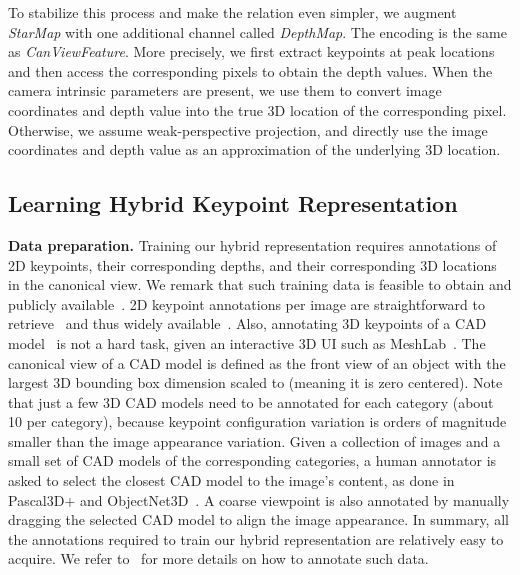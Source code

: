 \documentclass[runningheads]{llncs}
\begin{document}
To stabilize this process and make the relation even simpler, we augment \emph{StarMap} with one additional channel called \emph{DepthMap}. 
The encoding is the same as \emph{CanViewFeature}. 
More precisely, we first extract keypoints at peak locations and then access the corresponding pixels to obtain the depth values.
When the camera intrinsic parameters are present, we use them to convert image coordinates and depth value into the true 3D location of the corresponding pixel. 
Otherwise, we assume weak-perspective projection, and directly use the image coordinates and depth value as an approximation of the underlying 3D location.

\label{Section:Representation:Encoding}

\subsection{Learning Hybrid Keypoint Representation}
\label{Section:Training:Data:Preparation}

\noindent\textbf{Data preparation.} 
Training our hybrid representation requires annotations of 2D keypoints, their corresponding depths, and their corresponding 3D locations in the canonical view.
We remark that such training data is feasible to obtain and publicly available~\cite{xiang2014beyond,xiang2016objectnet3d}. 
2D keypoint annotations per image are straightforward to retrieve~\cite{papadopoulos2017extreme} and thus widely available~\cite{lin2014microsoft,andriluka14cvpr,bourdev2010detecting}.
Also, annotating 3D keypoints of a CAD model~\cite{yi2016scalable} is not a hard task, given an interactive 3D UI such as MeshLab~\cite{LocalChapterEvents:ItalChap:ItalianChapConf2008:129-136}. 
The canonical view of a CAD model is defined as the front view of an object with the largest 3D bounding box dimension scaled to  (meaning it is zero centered). 
Note that just a few 3D CAD models need to be annotated for each category (about 10 per category), because keypoint configuration variation is orders of magnitude smaller than the image appearance variation. 
Given a collection of images and a small set of CAD models of the corresponding categories, a human annotator is asked to select the closest CAD model to the image's content, as done in Pascal3D+ and ObjectNet3D~\cite{xiang2014beyond,xiang2016objectnet3d}.
A coarse viewpoint is also annotated by manually dragging the selected CAD model to align the image appearance. 
In summary, all the annotations required to train our hybrid representation are relatively easy to acquire. 
We refer to~\cite{xiang2014beyond,xiang2016objectnet3d} for more details on how to annotate such data. 
\end{document}
